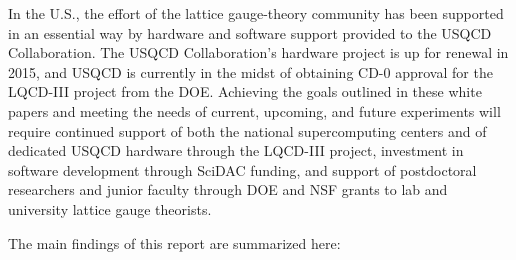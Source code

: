 In the U.S., the effort of the lattice gauge-theory community has been
supported in an essential way by hardware and software support provided to the
USQCD Collaboration.  The USQCD Collaboration's hardware project is up for
renewal in 2015, and USQCD is currently in the midst of obtaining CD-0
approval for the LQCD-III project from the DOE.  Achieving the goals outlined
in these white papers and meeting the needs of current, upcoming, and future
experiments will require continued support of both the national supercomputing
centers and of dedicated USQCD hardware through the LQCD-III project,
investment in software development through SciDAC funding, and support of
postdoctoral researchers and junior faculty through DOE and NSF grants to lab
and university lattice gauge theorists.

The main findings of this report are summarized here:

